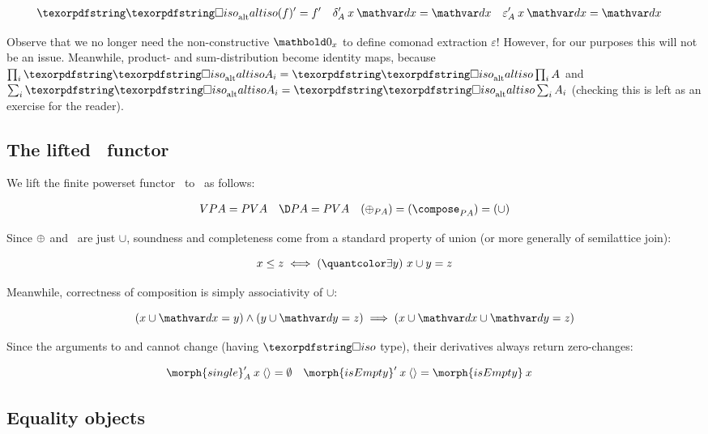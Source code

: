 \nopagebreak[2]
\begin{align*}
  \deriv{\altiso(f)} &= \deriv f
  & \deriv\delta_A \<x\<\dx &= \dx
  & \deriv\varepsilon_A \<x\<\dx &= \dx
\end{align*}

\noindent
Observe that we no longer need the non-constructive $\zero_x$ to define comonad
extraction $\varepsilon$! However, for our purposes this will not be an issue.
Meanwhile, product- and sum-distribution become identity maps, because $\prod_i
\altiso A_i = \altiso \prod_i A$ and $\sum_i \altiso A_i = \altiso \sum_i
A_i$ (checking this is left as an exercise for the reader).


\subsection{\texorpdfstring{\boldmath}{}The lifted \pfin\ functor}
\label{sec:CP-pfin}

We lift the finite powerset functor \pfin\ to \CP\ as follows:

\nopagebreak[2]
\begin{align}
  \vals{\pfinof A} &= \pfinof{\vals A} &
  \chgs{\pfinof A} &= \pfinof{\vals A} &
  (\updfn_{\pfinof A}) = (\composefn_{\pfinof A}) = ({\cup})
  \label{eqn:CP-pfin}
\end{align}

\noindent Since ${\mathbin{\oplus}}$ and \composefn\ are just $\cup$, soundness and
completeness come from a standard property of union (or more generally of
semilattice join):

\nopagebreak[2]
\[ x \le z \iff \ex{y} x \cup y = z \]

\noindent Meanwhile, correctness of composition is simply associativity of
$\cup$:

\nopagebreak[2]
\[ (x \cup \dx = y) \wedge (y \cup \dy = z) \implies (x \cup \dx \cup \dy = z) \]

\noindent
Since the arguments to  and  cannot change
(having $\iso$ type), their derivatives always return zero-changes:

\nopagebreak[2]
\begin{align*}
  \deriv{\morph{single}}_A \<x \<\tuple{} &= \emptyset &
  \deriv{\morph{isEmpty}} \<x \<\tuple{} &= \morph{isEmpty} \< x
\end{align*}



\subsection{Equality objects}
\label{sec:CP-eq}

